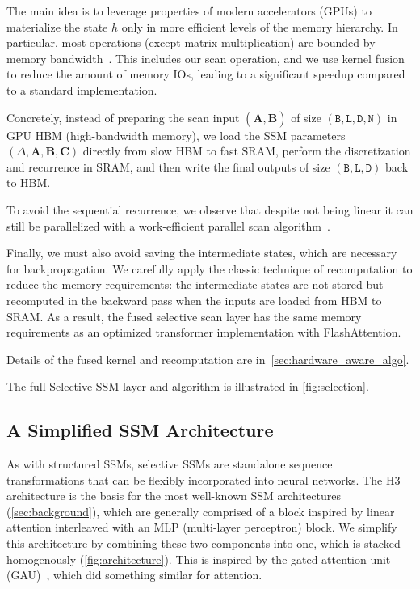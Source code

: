 The main idea is to leverage properties of modern accelerators (GPUs) to materialize the state $h$ only in more efficient levels of the memory hierarchy. In particular, most operations (except matrix multiplication) are bounded by memory bandwidth~\citep{williams2009roofline,ivanov2021data,dao2022flashattention}.
This includes our scan operation, and we use kernel fusion to reduce the amount of memory IOs, leading to a significant speedup compared to a standard implementation.

Concretely, instead of preparing the scan input
$(\overline{\bm{A}}, \overline{\bm{B}})$ of size $\mathtt{(B,L,D,N)}$ in GPU HBM (high-bandwidth memory), we load the SSM parameters $(\Delta, \bm{A}, \bm{B}, \bm{C})$ directly from slow HBM to fast SRAM, perform the discretization and recurrence in SRAM, and then write the final outputs of size $(\mathtt{B,L,D})$ back to HBM.

To avoid the sequential recurrence, we observe that despite not being linear it can still be parallelized with a work-efficient parallel scan algorithm~\citep{blelloch1990prefix,martin2018parallelizing,smith2023s5}.

Finally, we must also avoid saving the intermediate states, which are necessary for backpropagation. We carefully apply the classic technique of recomputation to reduce the memory requirements: the intermediate states are not stored but recomputed in the backward pass when the inputs are loaded from HBM to SRAM. As a result, the fused selective scan layer has the same memory requirements as an optimized transformer implementation with FlashAttention.

Details of the fused kernel and recomputation are in~\ref{sec:hardware_aware_algo}.

  The full Selective SSM layer and algorithm is illustrated in \ref{fig:selection}.

\subsection{A Simplified SSM Architecture}
\label{sec:method:architecture}

As with structured SSMs, selective SSMs are standalone sequence transformations that can be flexibly incorporated into neural networks. The H3 architecture is the basis for the most well-known SSM architectures (\ref{sec:background}), 
which are generally comprised of a block inspired by linear attention interleaved with an MLP (multi-layer perceptron) block. We simplify this architecture by combining these two components into one, which is stacked homogenously (\ref{fig:architecture}).
This is inspired by the gated attention unit (GAU)~\citep{hua2022transformer}, which did something similar for attention.

